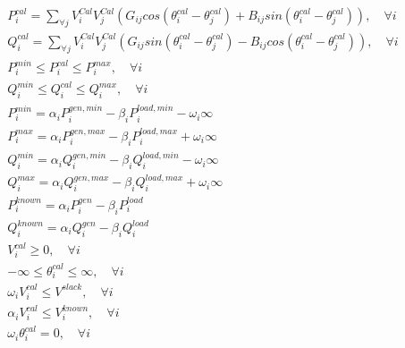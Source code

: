 \documentclass{article}
\begin{document}
\begin{align}
    P^{cal}_{i} = \sum_{\forall j}{V^{Cal}_{i}V^{Cal}_{j}(G_{ij}cos(\theta^{cal}_{i} - \theta^{cal}_{j}) + B_{ij}sin(\theta^{cal}_{i} - \theta^{cal}_{j}))}, \quad \forall i  \\
    Q^{cal}_{i} = \sum_{\forall j}{V^{Cal}_{i}V^{Cal}_{j}(G_{ij}sin(\theta^{cal}_{i} - \theta^{cal}_{j}) - B_{ij}cos(\theta^{cal}_{i} - \theta^{cal}_{j}))}, \quad \forall i \\
    P^{min}_{i} \leq P^{cal}_{i} \leq P^{max}_{i}, \quad \forall i\\
    Q^{min}_{i} \leq Q^{cal}_{i} \leq Q^{max}_{i}, \quad \forall i\\
    P^{min}_{i} = \alpha_{i}P^{gen,min}_{i}-\beta_{i}P^{load,min}_{i} - \omega_{i}\infty\\
    P^{max}_{i} = \alpha_{i}P^{gen,max}_{i}-\beta_{i}P^{load,max}_{i} + \omega_{i}\infty\\
    Q^{min}_{i} = \alpha_{i}Q^{gen,min}_{i}-\beta_{i}Q^{load,min}_{i} - \omega_{i}\infty\\
    Q^{max}_{i} = \alpha_{i}Q^{gen,max}_{i}-\beta_{i}Q^{load,max}_{i} + \omega_{i}\infty\\
    P^{known}_{i} = \alpha_{i}P^{gen}_{i}-\beta_{i}P^{load}_{i}\\
    Q^{known}_{i} = \alpha_{i}Q^{gen}_{i}-\beta_{i}Q^{load}_{i}\\
    V^{cal}_{i} \geq 0, \quad \forall i\\
    -\infty \leq \theta^{cal}_{i} \leq \infty, \quad \forall i\\
    \omega_{i}V^{cal}_{i} \leq V^{slack}, \quad \forall i\\
    \alpha_{i}V^{cal}_{i} \leq V^{known}_{i}, \quad \forall i\\
    \omega_{i}\theta^{cal}_{i} = 0, \quad \forall i
\end{align}
\end{document}
